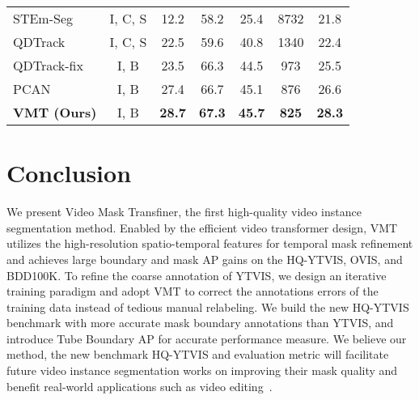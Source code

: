 \documentclass[runningheads]{llncs}
\begin{document}
\begin{table}[!t]
\begin{minipage}[t]{0.55\linewidth}
{\begin{tabular}{lcccccc}
					STEm-Seg~\cite{Athar_Mahadevan20ECCV} & I, C, S  & 12.2 & 58.2 & 25.4 & 8732 & 21.8 \\
					QDTrack~\cite{qdtrack} & I, C, S  & 22.5 & 59.6 & 40.8 & 1340  & 22.4 \\
					QDTrack-fix~\cite{qdtrack} & I, B & 23.5 & 66.3 & 44.5 & 973 & 25.5 \\
					PCAN~\cite{pcan} & I, B  & 27.4 & 66.7 & 45.1 & 876 & 26.6 \\
					\hline
					\textbf{VMT (Ours)} & I, B  & \textbf{28.7} & \textbf{67.3} & \textbf{45.7} & \textbf{825} &  \textbf{28.3} \\
\bottomrule
			\end{tabular}}
			\label{tab:bdd}
		\end{minipage}\end{table}
	

\section{Conclusion}

We present Video Mask Transfiner, the first high-quality video instance segmentation method. 
Enabled by the efficient video transformer design, VMT utilizes the high-resolution spatio-temporal features for temporal mask refinement and achieves large boundary and mask AP gains on the HQ-YTVIS, OVIS, and BDD100K.
To refine the coarse annotation of YTVIS, we design an iterative training paradigm and adopt VMT to correct the annotations errors of the training data instead of tedious manual relabeling. 
We build the new HQ-YTVIS benchmark with more accurate mask boundary annotations than YTVIS, and introduce Tube Boundary AP for accurate performance measure. 
We believe our method, the new benchmark HQ-YTVIS and evaluation metric will facilitate future video instance segmentation works on improving their mask quality and benefit real-world applications such as video editing~\cite{alldieck2018video,ke2021voin}.








\end{document}
